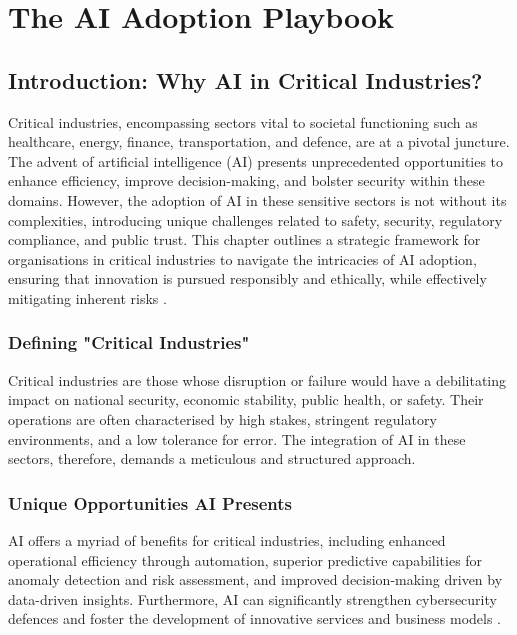 \chapter{The AI Adoption Playbook}
\label{cha:the_ai_adoption_playbook}

\section{Introduction: Why AI in Critical Industries?}

Critical industries, encompassing sectors vital to societal functioning such as healthcare, energy, finance, transportation, and defence, are at a pivotal juncture. The advent of artificial intelligence (AI) presents unprecedented opportunities to enhance efficiency, improve decision-making, and bolster security within these domains. However, the adoption of AI in these sensitive sectors is not without its complexities, introducing unique challenges related to safety, security, regulatory compliance, and public trust. This chapter outlines a strategic framework for organisations in critical industries to navigate the intricacies of AI adoption, ensuring that innovation is pursued responsibly and ethically, while effectively mitigating inherent risks \parencite{leyliabadi2025conceptual}.

\subsection{Defining "Critical Industries"}

Critical industries are those whose disruption or failure would have a debilitating impact on national security, economic stability, public health, or safety. Their operations are often characterised by high stakes, stringent regulatory environments, and a low tolerance for error. The integration of AI in these sectors, therefore, demands a meticulous and structured approach.

\subsection{Unique Opportunities AI Presents}

AI offers a myriad of benefits for critical industries, including enhanced operational efficiency through automation, superior predictive capabilities for anomaly detection and risk assessment, and improved decision-making driven by data-driven insights. Furthermore, AI can significantly strengthen cybersecurity defences and foster the development of innovative services and business models \parencite{cisc2025artificial}.

